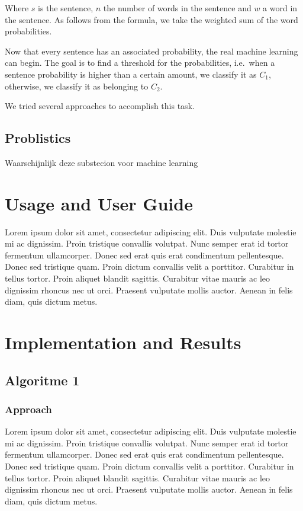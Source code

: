 \documentclass[11pt]{article}
\begin{document}
Where $s$ is the sentence, $n$ the number of words in the sentence and $w$ a word in the sentence. As follows from the formula, we take the weighted sum of the word probabilities.

Now that every sentence has an associated probability, the real machine learning can begin. The goal is to find a threshold for the probabilities, i.e.\ when a sentence probability is higher than a certain amount, we classify it as $C_1$,  otherwise, we classify it as belonging to $C_2$.

We tried several approaches to accomplish this task.

\subsection{Problistics}
Waarschijnlijk deze substecion voor machine learning

\section{Usage and User Guide}
Lorem ipsum dolor sit amet, consectetur adipiscing elit. Duis vulputate molestie mi ac dignissim. Proin tristique convallis volutpat. Nunc semper erat id tortor fermentum ullamcorper. Donec sed erat quis erat condimentum pellentesque. Donec sed tristique quam. Proin dictum convallis velit a porttitor. Curabitur in tellus tortor. Proin aliquet blandit sagittis. Curabitur vitae mauris ac leo dignissim rhoncus nec ut orci. Praesent vulputate mollis auctor. Aenean in felis diam, quis dictum metus.

\section{Implementation and Results}
\subsection{Algoritme 1}
\subsubsection{Approach}
Lorem ipsum dolor sit amet, consectetur adipiscing elit. Duis vulputate molestie mi ac dignissim. Proin tristique convallis volutpat. Nunc semper erat id tortor fermentum ullamcorper. Donec sed erat quis erat condimentum pellentesque. Donec sed tristique quam. Proin dictum convallis velit a porttitor. Curabitur in tellus tortor. Proin aliquet blandit sagittis. Curabitur vitae mauris ac leo dignissim rhoncus nec ut orci. Praesent vulputate mollis auctor. Aenean in felis diam, quis dictum metus.
\end{document}
